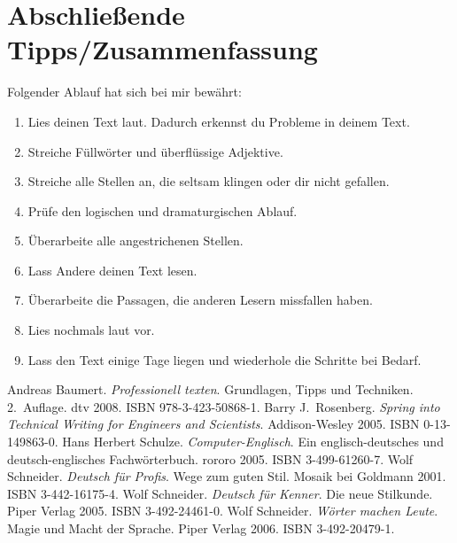 \documentclass[a4paper,titlepage=true,twoside]{scrartcl}
\newcommand{\gquote}[1]{\glqq #1\grqq}
\begin{document}
\section{Abschließende Tipps/Zusammenfassung}
Folgender Ablauf hat sich bei mir bewährt:

\begin{enumerate}
 \item Lies deinen Text laut. Dadurch erkennst du Probleme in deinem Text.
 \item Streiche Füllwörter und überflüssige Adjektive. 
 \item Streiche alle Stellen an, die seltsam klingen oder dir nicht gefallen.
 \item Prüfe den logischen und \gquote{dramaturgischen}  Ablauf.
 \item Überarbeite alle angestrichenen Stellen.
 \item Lass Andere deinen Text lesen.
 \item Überarbeite die Passagen, die anderen Lesern missfallen haben.
 \item Lies nochmals laut vor.
 \item Lass den Text einige Tage liegen und wiederhole die Schritte bei Bedarf.
\end{enumerate}




\begin{thebibliography}{baum08}
  Andreas Baumert. \emph{Professionell texten}. Grundlagen, Tipps und
Techniken. 2.~Auflage. dtv 2008. ISBN 978-3-423-50868-1.
  Barry J.\ Rosenberg. 
\emph{Spring into Technical Writing for Engineers and Scientists}.
Addison-Wesley 2005. ISBN 0-13-149863-0.
  Hans Herbert Schulze. \emph{Computer-Englisch}.
Ein englisch-deutsches und deutsch-englisches 
Fachwörterbuch. rororo 2005. ISBN 3-499-61260-7.
  Wolf Schneider. \emph{Deutsch für Profis}.
Wege zum guten Stil. Mosaik bei Goldmann 2001. ISBN 3-442-16175-4.
  Wolf Schneider. \emph{Deutsch für Kenner}.
Die neue Stilkunde. Piper Verlag 2005. ISBN 3-492-24461-0.
  Wolf Schneider. \emph{Wörter machen Leute}.
Magie und Macht der Sprache. Piper Verlag 2006. ISBN 3-492-20479-1.
\end{thebibliography}

\end{document}
